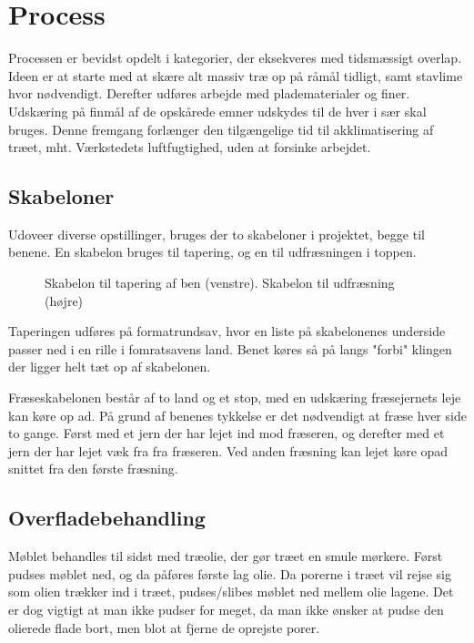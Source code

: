 \section*{Process}
Processen er bevidst opdelt i kategorier, der eksekveres med tidsmæssigt
overlap. Ideen er at starte med at skære alt massiv træ op på råmål tidligt,
samt stavlime hvor nødvendigt. Derefter udføres arbejde med pladematerialer og
finer. Udskæring på finmål af de opskårede emner udskydes til de hver i sær skal
bruges. Denne fremgang forlænger den tilgængelige tid til akklimatisering af
træet, mht. Værkstedets luftfugtighed, uden at forsinke arbejdet.

\subsection*{Skabeloner}
Udoveer diverse opstillinger, bruges der to skabeloner i projektet, begge til
benene. En skabelon bruges til tapering, og en til udfræsningen i toppen.

\begin{figure}[htb]
\centering
{}
\caption{Skabelon til tapering af ben (venstre). Skabelon til udfræsning (højre)}
\end{figure}

Taperingen udføres på formatrundsav, hvor en liste på skabelonenes underside
passer ned i en rille i fomratsavens land. Benet køres så på langs "forbi"
klingen der ligger helt tæt op af skabelonen.

Fræseskabelonen består af to land og et stop, med en udskæring fræsejernets leje kan køre
op ad. På grund af benenes tykkelse er det nødvendigt at fræse hver side to
gange. Først med et jern der har lejet ind mod fræseren, og derefter med et jern
der har lejet væk fra fra fræseren. Ved anden fræsning kan lejet køre opad
snittet fra den første fræsning.

\subsection*{Overfladebehandling}
Møblet behandles til sidst med træolie, der gør træet en smule mørkere. Først
pudses møblet ned, og da påføres første lag olie. Da porerne i træet vil rejse
sig som olien trækker ind i træet, pudses/slibes møblet ned mellem olie lagene.
Det er dog vigtigt at man ikke pudser for meget, da man ikke ønsker at pudse den
olierede flade bort, men blot at fjerne de oprejste porer.

